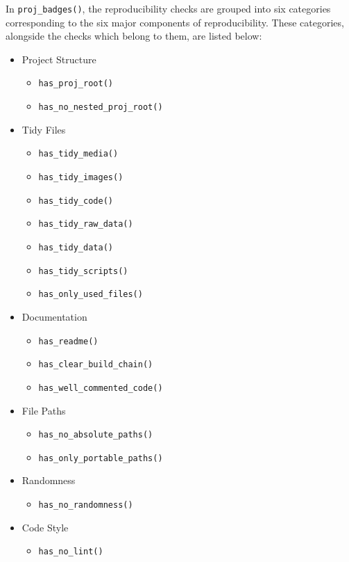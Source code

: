 \documentclass[12pt,twoside]{reedthesis}
\providecommand{\tightlist}{%
  \setlength{\itemsep}{0pt}\setlength{\parskip}{0pt}}
\begin{document}
In \texttt{proj\_badges()}, the reproducibility checks are grouped into six categories corresponding to the six major components of reproducibility. These categories, alongside the checks which belong to them, are listed below:
\begin{itemize}
\tightlist
\item
  Project Structure
  \begin{itemize}
  \tightlist
  \item
    \texttt{has\_proj\_root()}
  \item
    \texttt{has\_no\_nested\_proj\_root()}
  \end{itemize}
\item
  Tidy Files
  \begin{itemize}
  \tightlist
  \item
    \texttt{has\_tidy\_media()}
  \item
    \texttt{has\_tidy\_images()}
  \item
    \texttt{has\_tidy\_code()}
  \item
    \texttt{has\_tidy\_raw\_data()}
  \item
    \texttt{has\_tidy\_data()}
  \item
    \texttt{has\_tidy\_scripts()}
  \item
    \texttt{has\_only\_used\_files()}
  \end{itemize}
\item
  Documentation
  \begin{itemize}
  \tightlist
  \item
    \texttt{has\_readme()}
  \item
    \texttt{has\_clear\_build\_chain()}
  \item
    \texttt{has\_well\_commented\_code()}
  \end{itemize}
\item
  File Paths
  \begin{itemize}
  \tightlist
  \item
    \texttt{has\_no\_absolute\_paths()}
  \item
    \texttt{has\_only\_portable\_paths()}
  \end{itemize}
\item
  Randomness
  \begin{itemize}
  \tightlist
  \item
    \texttt{has\_no\_randomness()}
  \end{itemize}
\item
  Code Style
  \begin{itemize}
  \tightlist
  \item
    \texttt{has\_no\_lint()}
  \end{itemize}
\end{itemize}
\end{document}
